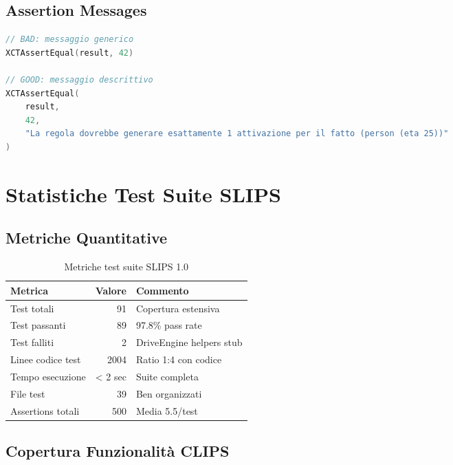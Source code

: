 \subsection{Assertion Messages}

\begin{lstlisting}[language=Swift]
// BAD: messaggio generico
XCTAssertEqual(result, 42)

// GOOD: messaggio descrittivo
XCTAssertEqual(
    result,
    42,
    "La regola dovrebbe generare esattamente 1 attivazione per il fatto (person (eta 25))"
)
\end{lstlisting}

\section{Statistiche Test Suite SLIPS}

\subsection{Metriche Quantitative}

\begin{table}[h]
\centering
\begin{tabular}{@{}lrl@{}}
\toprule
\textbf{Metrica} & \textbf{Valore} & \textbf{Commento} \\
\midrule
Test totali & 91 & Copertura estensiva \\
Test passanti & 89 & 97.8\% pass rate \\
Test falliti & 2 & DriveEngine helpers stub \\
Linee codice test & 2004 & Ratio 1:4 con codice \\
Tempo esecuzione & < 2 sec & Suite completa \\
File test & 39 & Ben organizzati \\
Assertions totali & ~500 & Media 5.5/test \\
\bottomrule
\end{tabular}
\caption{Metriche test suite SLIPS 1.0}
\label{tab:test_stats}
\end{table}

\subsection{Copertura Funzionalità CLIPS}

